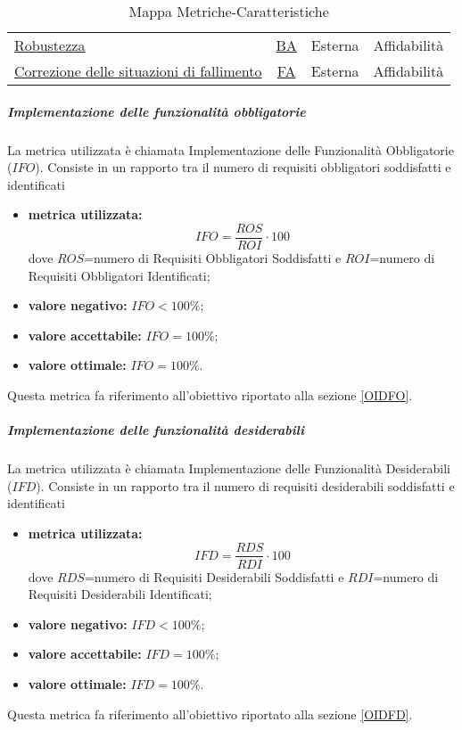 \begin{table}[H]
\begin{tabular}{l | c| c| c}
						\hyperref[OR]{Robustezza}                                                                     & \hyperref[MR]{BA}               & Esterna       & Affidabilità            \\
						\hyperref[OCDSDF]{Correzione delle situazioni di fallimento}                           & \hyperref[MCDSDF]{FA}               & Esterna       & Affidabilità            \\ \hline
					\end{tabular}
					\caption{Mappa Metriche-Caratteristiche}
					\label{tab:mappa_metriche_caratteristiche}
				\end{table}
				
				\subparagraph{Implementazione delle funzionalità obbligatorie}
				\label{MIDFO}
				La metrica utilizzata è chiamata Implementazione delle Funzionalità Obbligatorie ($IFO$). Consiste in un rapporto tra il numero di requisiti obbligatori soddisfatti e identificati
				\begin{itemize}
					\item \textbf{metrica utilizzata:} $$IFO= \frac{ROS}{ROI}\cdot 100$$
					dove $ROS$=numero di Requisiti Obbligatori Soddisfatti e $ROI$=numero di Requisiti Obbligatori Identificati;
					\item \textbf{valore negativo:} $IFO<100\%$;
					\item \textbf{valore accettabile:} $IFO=100\%$;
					\item \textbf{valore ottimale:} $IFO=100\%$.
				\end{itemize}
				Questa metrica fa riferimento all'obiettivo riportato alla sezione \ref{OIDFO}.
				
				\subparagraph{Implementazione delle funzionalità desiderabili}
				\label{MIDFD}
				La metrica utilizzata è chiamata Implementazione delle Funzionalità Desiderabili ($IFD$). Consiste in un rapporto tra il numero di requisiti desiderabili soddisfatti e identificati
				\begin{itemize}
					\item \textbf{metrica utilizzata:} $$IFD= \frac{RDS}{RDI}\cdot 100$$
					dove $RDS$=numero di Requisiti Desiderabili Soddisfatti e $RDI$=numero di Requisiti Desiderabili Identificati;
					\item \textbf{valore negativo:} $IFD<100\%$;
					\item \textbf{valore accettabile:} $IFD=100\%$;
					\item \textbf{valore ottimale:} $IFD=100\%$.
				\end{itemize}
				Questa metrica fa riferimento all'obiettivo riportato alla sezione \ref{OIDFD}.\\
				
